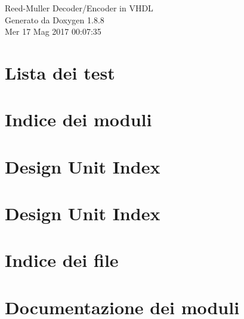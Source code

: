 \documentclass[twoside]{book}
\newcommand{\+}{\discretionary{\mbox{\scriptsize$\hookleftarrow$}}{}{}}
\newcommand{\clearemptydoublepage}{%
  \newpage{\pagestyle{empty}\cleardoublepage}%
}
\begin{document}
\hypersetup{pageanchor=false,
             bookmarks=true,
             bookmarksnumbered=true,
             pdfencoding=unicode
            }
\begin{titlepage}
\vspace*{7cm}
\begin{center}%
{\Large Reed-\/\+Muller Decoder/\+Encoder in V\+H\+D\+L }\\
\vspace*{1cm}
{\large Generato da Doxygen 1.8.8}\\
\vspace*{0.5cm}
{\small Mer 17 Mag 2017 00:07:35}\\
\end{center}
\end{titlepage}
\clearemptydoublepage
\tableofcontents
\clearemptydoublepage
{}
\hypersetup{pageanchor=true}

\chapter{Lista dei test}
\label{test}
\hypertarget{test}{}

\chapter{Indice dei moduli}

\chapter{Design Unit Index}

\chapter{Design Unit Index}

\chapter{Indice dei file}

\chapter{Documentazione dei moduli}



\end{document}
